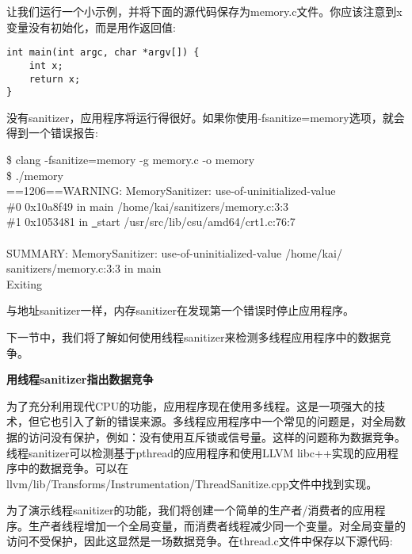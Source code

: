 让我们运行一个小示例，并将下面的源代码保存为memory.c文件。你应该注意到x变量没有初始化，而是用作返回值:\par

\begin{lstlisting}[caption={}]
int main(int argc, char *argv[]) {
	int x;
	return x;
}
\end{lstlisting}

没有sanitizer，应用程序将运行得很好。如果你使用-fsanitize=memory选项，就会得到一个错误报告:\par

\begin{tcolorbox}[colback=white,colframe=black]
\$ clang -fsanitize=memory -g memory.c -o memory \\
\$ ./memory \\
==1206==WARNING: MemorySanitizer: use-of-uninitialized-value \\
\hspace*{1cm}\#0 0x10a8f49 in main /home/kai/sanitizers/memory.c:3:3 \\
\hspace*{1cm}\#1 0x1053481 in \underline{~}start /usr/src/lib/csu/amd64/crt1.c:76:7 \\
\\
SUMMARY: MemorySanitizer: use-of-uninitialized-value /home/kai/ \\
sanitizers/memory.c:3:3 in main \\
Exiting
\end{tcolorbox}

与地址sanitizer一样，内存sanitizer在发现第一个错误时停止应用程序。\par

下一节中，我们将了解如何使用线程sanitizer来检测多线程应用程序中的数据竞争。\par

\hspace*{\fill} \par %
\textbf{用线程sanitizer指出数据竞争}

为了充分利用现代CPU的功能，应用程序现在使用多线程。这是一项强大的技术，但它也引入了新的错误来源。多线程应用程序中一个常见的问题是，对全局数据的访问没有保护，例如：没有使用互斥锁或信号量。这样的问题称为数据竞争。线程sanitizer可以检测基于pthread的应用程序和使用LLVM libc++实现的应用程序中的数据竞争。可以在llvm/lib/Transforms/Instrumentation/ThreadSanitize.cpp文件中找到实现。\par

为了演示线程sanitizer的功能，我们将创建一个简单的生产者/消费者的应用程序。生产者线程增加一个全局变量，而消费者线程减少同一个变量。对全局变量的访问不受保护，因此这显然是一场数据竞争。在thread.c文件中保存以下源代码:\par

